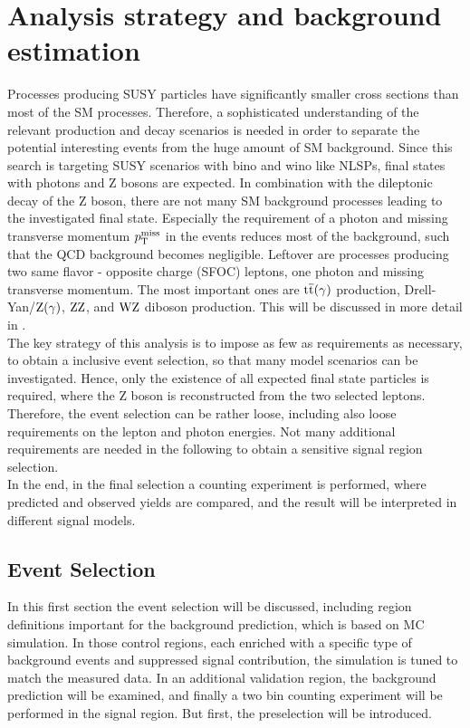 \chapter{Analysis strategy and background estimation}\label{chap:analysis}
\minitoc
Processes producing SUSY particles have significantly smaller cross sections than most of the SM processes. Therefore, a sophisticated understanding of the relevant production and decay scenarios is needed in order to separate the potential interesting events from the huge amount of SM background. Since this search is targeting SUSY scenarios with bino and wino like NLSPs, final states with photons and Z bosons are expected. In combination with the dileptonic decay of the Z boson, there are not many SM background processes leading to the investigated final state. Especially the requirement of a photon and missing transverse momentum $p_{\mathrm{T}}^\text{miss}$ in the events reduces most of the background, such that \eg the QCD background becomes negligible. Leftover are processes producing two same flavor - opposite charge (SFOC) leptons, one photon and missing transverse momentum. The most important ones are ${\mathrm{t}\overline{\mathrm{t}}}(\gamma)$ production, Drell-Yan/$\mathrm{Z}(\gamma)$, $\mathrm{Z}\mathrm{Z}$, and $\mathrm{W}\mathrm{Z}$ diboson production. This will be discussed in more detail in .\\
The key strategy of this analysis is to impose as few as requirements as necessary, to obtain a inclusive event selection, so that many model scenarios can be investigated. Hence, only the existence of all expected final state particles is required, where the Z boson is reconstructed from the two selected leptons. Therefore, the event selection can be rather loose, including also loose requirements on the lepton and photon energies. Not many additional requirements are needed in the following to obtain a sensitive signal region selection.\\
In the end, in the final selection a counting experiment is performed, where predicted and observed yields are compared, and the result will be interpreted in different signal models.

\section{Event Selection}
In this first section the event selection will be discussed, including region definitions important for the background prediction, which is based on MC simulation. In those control regions, each enriched with a specific type of background events and suppressed signal contribution, the simulation is tuned to match the measured data. In an additional validation region, the background prediction will be examined, and finally a two bin counting experiment will be performed in the signal region. But first, the preselection will be introduced.
